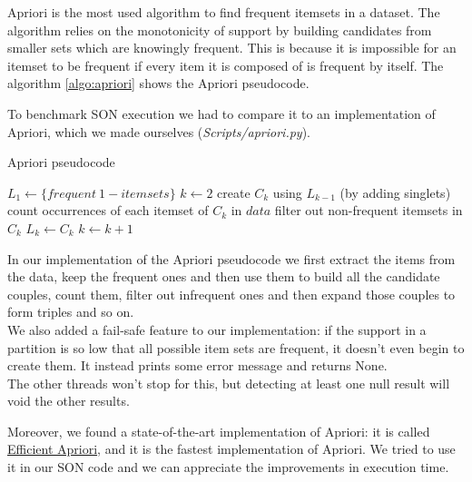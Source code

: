 \documentclass[a4paper]{article}
\begin{document}
	Apriori is the most used algorithm to find frequent itemsets in a dataset. The algorithm relies on the monotonicity of support by building candidates from smaller sets which are knowingly frequent. This is because it is impossible for an itemset to be frequent if every item it is composed of is frequent by itself. The algorithm \ref{algo:apriori} shows the Apriori pseudocode.
	
	To benchmark SON execution we had to compare it to an implementation of Apriori, which we made ourselves (\textit{Scripts/apriori.py}).
	
\begin{algorithm}
\caption{Apriori pseudocode}
\label{algo:apriori}
\begin{algorithmic}[1]
	\State $L_1 \gets \{frequent \ 1-itemsets\}$ 
    	\State $k \gets 2$
    		\State create $C_k$ using $L_{k-1}$ (by adding singlets) 
    		\State count occurrences of each itemset of $C_k$ in $data$
    		\State filter out non-frequent itemsets in $C_k$
    		\State $L_k \gets C_k$
    		\State $k \gets k+1$
    	\EndWhile
\EndFunction
\end{algorithmic}
\end{algorithm}

    In our implementation of the Apriori pseudocode we first extract the items from the data, keep the frequent ones and then use them to build all the candidate couples, count them, filter out infrequent ones and then expand those couples to form triples and so on.\\
    We also added a fail-safe feature to our implementation: if the support in a partition is so low that all possible item sets are frequent, it doesn't even begin to create them. It instead prints some error message and returns None.\\
	The other threads won't stop for this, but detecting at least one null result will void the other results.

    Moreover, we found a state-of-the-art implementation of Apriori: it is called \href{https://github.com/tommyod/Efficient-Apriori}{Efficient Apriori}, and it is the fastest implementation of Apriori. We tried to use it in our SON code and we can appreciate the improvements in execution time.
	
\end{document}
